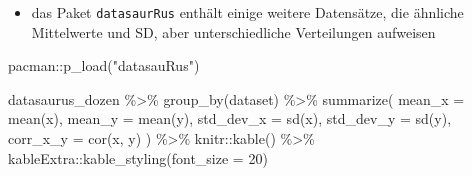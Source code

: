 \documentclass[
  letterpaper,
  DIV=11]{scrartcl}
\newenvironment{Shaded}{\begin{snugshade}}{\end{snugshade}}
\newcommand{\AttributeTok}[1]{\textcolor[rgb]{0.40,0.45,0.13}{#1}}
\newcommand{\DecValTok}[1]{\textcolor[rgb]{0.68,0.00,0.00}{#1}}
\newcommand{\FunctionTok}[1]{\textcolor[rgb]{0.28,0.35,0.67}{#1}}
\newcommand{\NormalTok}[1]{\textcolor[rgb]{0.00,0.23,0.31}{#1}}
\newcommand{\SpecialCharTok}[1]{\textcolor[rgb]{0.37,0.37,0.37}{#1}}
\newcommand{\StringTok}[1]{\textcolor[rgb]{0.13,0.47,0.30}{#1}}
\providecommand{\tightlist}{%
  \setlength{\itemsep}{0pt}\setlength{\parskip}{0pt}}\usepackage{longtable,booktabs,array}
\begin{document}
\begin{itemize}
\tightlist
\item
  das Paket \texttt{datasaurRus} enthält einige weitere Datensätze, die
  ähnliche Mittelwerte und SD, aber unterschiedliche Verteilungen
  aufweisen
\end{itemize}

\begin{Shaded}
\begin{Highlighting}[]
\NormalTok{pacman}\SpecialCharTok{::}\FunctionTok{p\_load}\NormalTok{(}\StringTok{"datasauRus"}\NormalTok{)}
\end{Highlighting}
\end{Shaded}

\begin{Shaded}
\begin{Highlighting}[]
\NormalTok{datasaurus\_dozen }\SpecialCharTok{\%\textgreater{}\%} 
    \FunctionTok{group\_by}\NormalTok{(dataset) }\SpecialCharTok{\%\textgreater{}\%} 
    \FunctionTok{summarize}\NormalTok{(}
      \AttributeTok{mean\_x    =} \FunctionTok{mean}\NormalTok{(x),}
      \AttributeTok{mean\_y    =} \FunctionTok{mean}\NormalTok{(y),}
      \AttributeTok{std\_dev\_x =} \FunctionTok{sd}\NormalTok{(x),}
      \AttributeTok{std\_dev\_y =} \FunctionTok{sd}\NormalTok{(y),}
      \AttributeTok{corr\_x\_y  =} \FunctionTok{cor}\NormalTok{(x, y)}
\NormalTok{    ) }\SpecialCharTok{\%\textgreater{}\%} 
\NormalTok{  knitr}\SpecialCharTok{::}\FunctionTok{kable}\NormalTok{() }\SpecialCharTok{\%\textgreater{}\%} 
\NormalTok{  kableExtra}\SpecialCharTok{::}\FunctionTok{kable\_styling}\NormalTok{(}\AttributeTok{font\_size =} \DecValTok{20}\NormalTok{)}
\end{Highlighting}
\end{Shaded}
\end{document}
